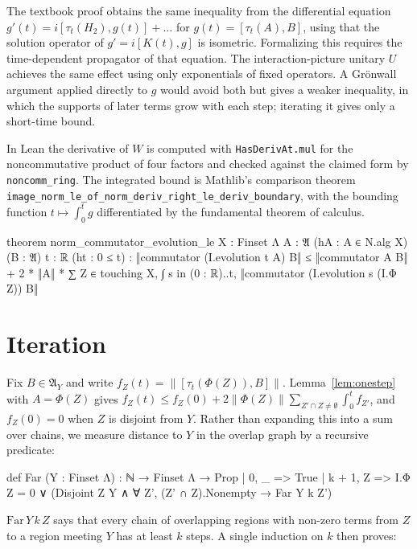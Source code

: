 \documentclass[11pt]{article}
\theoremstyle{definition}
\theoremstyle{remark}
\newcommand{\fA}{\mathfrak{A}}
\newcommand{\norm}[1]{\|#1\|}
\newcommand{\Far}{\mathrm{Far}}
\begin{document}
The textbook proof \cite{nachtergaelesims2006} obtains the same inequality from the
differential equation $g'(t)=i[\tau_t(H_2),g(t)]+\dots$ for $g(t)=[\tau_t(A),B]$, using that the
solution operator of $g'=i[K(t),g]$ is isometric. Formalizing this requires the time-dependent
propagator of that equation. The interaction-picture unitary $U$ achieves the same effect using
only exponentials of fixed operators. A Grönwall argument applied directly to $g$ would avoid
both but gives a weaker inequality, in which the supports of later terms grow with each step;
iterating it gives only a short-time bound.

In Lean the derivative of $W$ is computed with \texttt{HasDerivAt.mul} for the noncommutative
product of four factors and checked against the claimed form by \texttt{noncomm\_ring}. The
integrated bound is Mathlib's comparison theorem
\texttt{image\_norm\_le\_of\_norm\_deriv\_right\_le\_deriv\_boundary}, with the bounding function
$t\mapsto\int_0^t g$ differentiated by the fundamental theorem of calculus.

\begin{lean}
theorem norm_commutator_evolution_le {X : Finset Λ} {A : 𝔄} (hA : A ∈ N.alg X) (B : 𝔄)
    {t : ℝ} (ht : 0 ≤ t) :
    ‖commutator (I.evolution t A) B‖ ≤ ‖commutator A B‖ +
      2 * ‖A‖ * ∑ Z ∈ touching X, ∫ s in (0 : ℝ)..t,
        ‖commutator (I.evolution s (I.Φ Z)) B‖
\end{lean}

\section{Iteration}\label{sec:iteration}

Fix $B\in\fA_Y$ and write $f_Z(t)=\norm{[\tau_t(\Phi(Z)),B]}$. Lemma~\ref{lem:onestep} with
$A=\Phi(Z)$ gives $f_Z(t)\le f_Z(0)+2\norm{\Phi(Z)}\sum_{Z'\cap Z\ne\emptyset}\int_0^tf_{Z'}$, and
$f_Z(0)=0$ when $Z$ is disjoint from $Y$. Rather than expanding this into a sum over chains, we
measure distance to $Y$ in the overlap graph by a recursive predicate:

\begin{lean}
def Far (Y : Finset Λ) : ℕ → Finset Λ → Prop
  | 0, _ => True
  | k + 1, Z => I.Φ Z = 0 ∨ (Disjoint Z Y ∧ ∀ Z', (Z' ∩ Z).Nonempty → Far Y k Z')
\end{lean}

$\Far\,Y\,k\,Z$ says that every chain of overlapping regions with non-zero terms from $Z$ to a
region meeting $Y$ has at least $k$ steps. A single induction on $k$ then proves:
\end{document}
